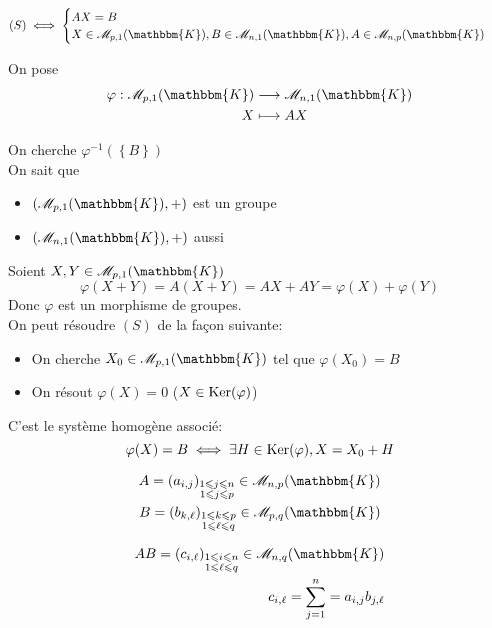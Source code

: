 \begin{rmk}
	\begin{align*}
		(S) &\iff \begin{cases}
			AX = B\\
			X \in \mathcal{M}_{p,1}(\mathbbm{K}), B \in \mathcal{M}_{n,1}(\mathbbm{K}), A \in \mathcal{M}_{n,p}(\mathbbm{K})
		\end{cases}
	\end{align*}

	On pose \begin{align*}
		\varphi: \mathcal{M}_{p,1}(\mathbbm{K}) &\longrightarrow \mathcal{M}_{n,1}(\mathbbm{K}) \\
		X &\longmapsto AX
	\end{align*}

	On cherche $\varphi^{-1} \left( \left\{ B \right\}  \right) $ \\

	On sait que
	\begin{itemize}
		\item $(\mathcal{M}_{p,1}(\mathbbm{K}), +)$ est un groupe
		\item $(\mathcal{M}_{n,1}(\mathbbm{K}), +)$ aussi
	\end{itemize}

	Soient $X, Y \in \mathcal{M}_{p,1}(\mathbbm{K})$ \[
		\varphi(X+Y) = A(X+Y) = AX + AY = \varphi(X) + \varphi(Y)
	\]Donc $\varphi$ est un morphisme de groupes.\\
	On peut résoudre $(S)$ de la fa\c con suivante:
	\begin{itemize}
		\item On cherche $X_0 \in \mathcal{M}_{p,1}(\mathbbm{K})$ tel que $\varphi(X_0) = B$ 
		\item On résout $\varphi(X) = 0$ ($X \in \operatorname{Ker}(\varphi)$)
	\end{itemize}\vspace{5mm}

	C'est le système homogène associé: \[
		\varphi(X) = B \iff \exists H \in \operatorname{Ker}(\varphi), X = X_0+H
	\]
\end{rmk}

\begin{prop}
	\begin{align*}
		A = \left(a_{i,j}\right)_{\substack{1 \le j\le n\\1\le j\le p}} \in \mathcal{M}_{n,p}(\mathbbm{K})\\
		B = \left(b_{k,\ell}\right)_{\substack{1 \le k\le p\\1\le \ell\le q}} \in \mathcal{M}_{p,q}(\mathbbm{K})
	\end{align*}

	\begin{align*}
		AB = \left( c_{i,\ell} \right) _{\substack{1\le i\le n\\1\le \ell\le q}} \in \mathcal{M}_{n,q}(\mathbbm{K})\\
		c_{i,\ell} = \sum_{j = 1}^n = a_{i,j}b_{j,\ell}
	\end{align*}
\end{prop}
